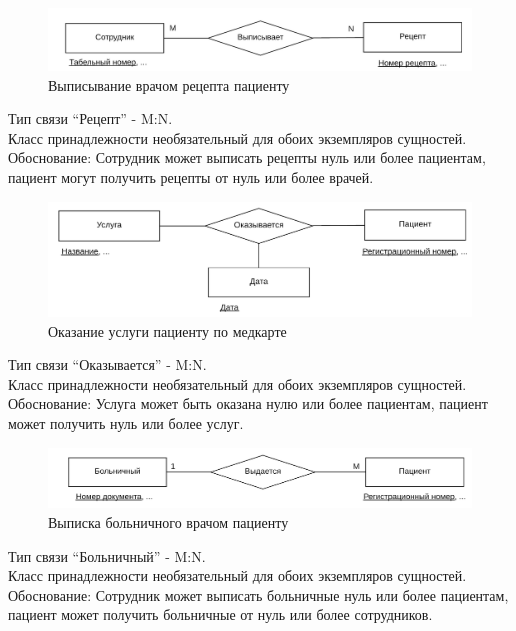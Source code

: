 \documentclass[14pt,a4paper,russian]{extreport}
\begin{document}
\begin{figure}[h!]
        \includegraphics[width=\textwidth]{receipt}
        \caption{Выписывание врачом рецепта пациенту}
        \label{fig:receipt}
\end{figure}

\noindent Тип связи ``Рецепт'' - M:N.\\
Класс принадлежности необязательный для обоих экземпляров сущностей.\\
Обоснование: Сотрудник может выписать рецепты нуль или более пациентам,
пациент могут получить рецепты от нуль или более врачей.\par

\begin{figure}[h!]
        \includegraphics[width=\textwidth]{servprovmedc}
        \caption{Оказание услуги пациенту по медкарте}
        \label{fig:servprovmedc}
\end{figure}

\noindent Тип связи ``Оказывается'' - M:N.\\
Класс принадлежности необязательный для обоих экземпляров сущностей.\\
Обоснование: Услуга может быть оказана нулю или более пациентам, пациент может получить нуль или
более услуг. 

\begin{figure}[h!]
        \includegraphics[width=\textwidth]{empbolpat}
        \caption{Выписка больничного врачом пациенту}
        \label{fig:empbolpat}
\end{figure}

\noindent Тип связи ``Больничный'' - M:N.\\
Класс принадлежности необязательный для обоих экземпляров сущностей.\\
Обоснование: Сотрудник может выписать больничные нуль или более пациентам, пациент может получить
больничные от нуль или более сотрудников.
\end{document}

